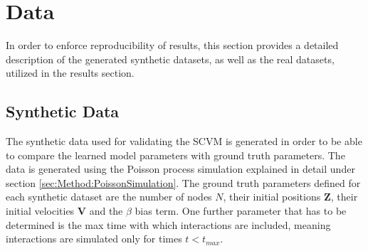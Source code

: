 \section{Data}
\label{sec:Data}
In order to enforce reproducibility of results, this section provides a detailed description of the generated synthetic datasets, as well as the real datasets, utilized in the results section.


\subsection{Synthetic Data}
\label{sec:Data:SyntheticData}
The synthetic data used for validating the SCVM is generated in order to be able to compare the learned model parameters with ground truth parameters.
The data is generated using the Poisson process simulation explained in detail under section \ref{sec:Method:PoissonSimulation}.
The ground truth parameters defined for each synthetic dataset are the number of nodes $N$, their initial positions $\textbf{Z}$, their initial velocities $\textbf{V}$ and the $\beta$ bias term.
One further parameter that has to be determined is the max time with which interactions are included, meaning interactions are simulated only for times $t < t_{max}$.


